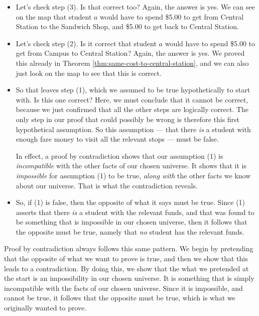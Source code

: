 \documentclass[../../../main.tex]{subfiles}
\begin{document}
\begin{itemize}
  \item Let's check step (3). Is that correct too? Again, the answer is yes. We can see on the map that student $a$ would have to spend \$5.00 to get from Central Station to the Sandwich Shop, and \$5.00 to get back to Central Station.
  
  \item Let's check step (2). Is it correct that student $a$ would have to spend \$5.00 to get from Campus to Central Station? Again, the answer is yes. We proved this already in Theorem \ref{thm:same-cost-to-central-station}, and we can also just look on the map to see that this is correct.
  
  \item So that leaves step (1), which we assumed to be true hypothetically to start with. Is this one correct? Here, we must conclude that it cannot be correct, because we just confirmed that all the other steps are logically correct. The only step in our proof that could possibly be wrong is therefore this first hypothetical assumption. So this assumption --- that there \emph{is} a student with enough fare money to visit all the relevant stops --- must be false.
  
  \begin{aside}
    \begin{remark}
      In effect, a proof by contradiction shows that our assumption (1) is \emph{incompatible} with the other facts of our chosen universe. It shows that it is \emph{impossible} for assumption (1) to be true, \emph{along with} the other facts we know about our universe. That is what the contradiction reveals.
    \end{remark}
  \end{aside}
  
  \item So, if (1) is false, then the opposite of what it says must be true. Since (1) asserts that there \emph{is} a student with the relevant funds, and that was found to be something that is impossible in our chosen universe, then it follows that the opposite must be true, namely that \emph{no} student has the relevant funds.
 
\end{itemize}

Proof by contradiction always follows this same pattern. We begin by pretending that the opposite of what we want to prove is true, and then we show that this leads to a contradiction. By doing this, we show that the what we pretended at the start is an impossibility in our chosen universe. It is something that is simply incompatible with the facts of our chosen universe. Since it is impossible, and cannot be true, it follows that the opposite must be true, which is what we originally wanted to prove.
\end{document}
